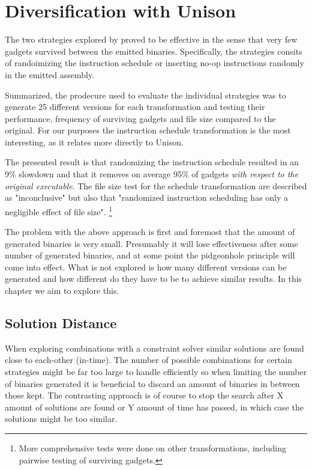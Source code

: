 \chapter{Diversification with Unison}

The two strategies explored by \textcite{large-scale-automated} proved to be effective in
the sense that very few gadgets survived between the emitted binaries. Specifically, the
strategies consits of randoimizing the instruction schedule or inserting no-op instructions
randomly in the emitted assembly.

Summarized, the prodecure \textcite{large-scale-automated} used to evaluate the individual
strategies was to generate 25 different versions for each transformation and testing their
performance, frequency of surviving gadgets and file size compared to the original. For
our purposes the instruction schedule transformation is the most interesting, as it relates
more directly to Unison.

The presented result is that randomizing the instruction schedule resulted in an 9\%
slowdown and that it removes on average 95\% of gadgets \textit{with respect to the original executable}.
The file size test for the schedule transformation are described as "inconclusive" but
also that "randomized instruction scheduling has only a negligible effect of file size".
\footnote{More comprehensive tests were done on other transformations, including pairwise
testing of surviving gadgets.}

The problem with the above approach is first and foremost that the amount of generated
binaries is very small. Presumably it will lose effectiveness after some number of
generated binaries, and at some point the pidgeonhole principle will come into effect.
What is not explored is how many different versions can be generated and how different do
they have to be to achieve similar results. In this chapter we aim to explore this.



\section{Solution Distance}
When exploring combinations with a constraint solver similar solutions are found close to
each-other (in-time).  The number of possible combinations for certain strategies might be
far too large to handle efficiently so when limiting the number of binaries generated it is
beneficial to discard an amount of binaries in between those kept. The contrasting approach
is of course to stop the search after X amount of solutions are found or Y amount of time
has passed, in which case the solutions might be too similar.

